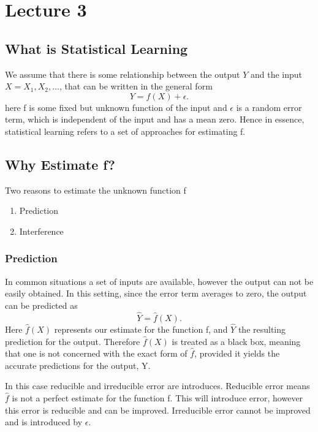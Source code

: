 \documentclass[12pt]{article}
\numberwithin{equation}{section}
\begin{document}
\section{Lecture 3}
\subsection{What is Statistical Learning}
We assume that there is some relationship between the output $Y$ and the input $X = X_1, X_2, ...$, that can be written in the general form
\begin{equation}
    Y = f(X) + \epsilon.
\end{equation}
here f is some fixed but unknown function of the input and $\epsilon$ is a random error term, which is independent of the input and has a mean zero. Hence in essence, statistical learning refers to a set of approaches for estimating f.

\subsection{Why Estimate f? }
Two reasons to estimate the unknown function f
\begin{enumerate}
    \item Prediction
    \item Interference
\end{enumerate}
\subsubsection{Prediction}
In common situations a set of inputs are available, however the output can not be easily obtained. In this setting, since the error term averages to zero, the output can be predicted as
\begin{equation}
    \hat{Y} = \hat{f}(X).
\end{equation}
Here $\hat{f}(X)$ represents our estimate for the function f, and $\hat{Y}$ the resulting prediction for the output. Therefore  $\hat{f}(X)$ is treated as a black box, meaning that one is not concerned with the exact form of $\hat{f}$, provided it yields the accurate predictions for the output, Y.

In this case reducible and irreducible error are introduces. Reducible error means $\hat{f}$ is not a perfect estimate for the function f. This will introduce error, however this error is reducible and can be improved. Irreducible error cannot be improved and is introduced by $\epsilon$.
\end{document}
